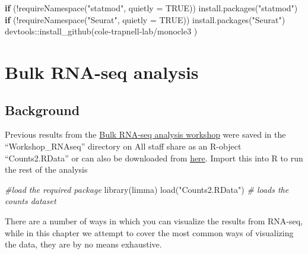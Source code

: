 \documentclass[
  openany]{book}
\newenvironment{Shaded}{\begin{snugshade}}{\end{snugshade}}
\newcommand{\AttributeTok}[1]{\textcolor[rgb]{0.77,0.63,0.00}{#1}}
\newcommand{\CommentTok}[1]{\textcolor[rgb]{0.56,0.35,0.01}{\textit{#1}}}
\newcommand{\ConstantTok}[1]{\textcolor[rgb]{0.00,0.00,0.00}{#1}}
\newcommand{\ControlFlowTok}[1]{\textcolor[rgb]{0.13,0.29,0.53}{\textbf{#1}}}
\newcommand{\FunctionTok}[1]{\textcolor[rgb]{0.00,0.00,0.00}{#1}}
\newcommand{\NormalTok}[1]{#1}
\newcommand{\SpecialCharTok}[1]{\textcolor[rgb]{0.00,0.00,0.00}{#1}}
\newcommand{\StringTok}[1]{\textcolor[rgb]{0.31,0.60,0.02}{#1}}
\begin{document}
\begin{Shaded}
\begin{Highlighting}[]
\ControlFlowTok{if}\NormalTok{ (}\SpecialCharTok{!}\FunctionTok{requireNamespace}\NormalTok{(}\StringTok{"statmod"}\NormalTok{, }\AttributeTok{quietly =} \ConstantTok{TRUE}\NormalTok{))}
  \FunctionTok{install.packages}\NormalTok{(}\StringTok{"statmod"}\NormalTok{)}
\ControlFlowTok{if}\NormalTok{ (}\SpecialCharTok{!}\FunctionTok{requireNamespace}\NormalTok{(}\StringTok{"Seurat"}\NormalTok{, }\AttributeTok{quietly =} \ConstantTok{TRUE}\NormalTok{))}
  \FunctionTok{install.packages}\NormalTok{(}\StringTok{"Seurat"}\NormalTok{)}
\NormalTok{devtools}\SpecialCharTok{::}\FunctionTok{install\_github}\NormalTok{(}\StringTok{\textquotesingle{}cole{-}trapnell{-}lab/monocle3\textquotesingle{}}
\NormalTok{)}
\end{Highlighting}
\end{Shaded}

\vspace{-100pt}

\hypertarget{bulk-rna-seq-analysis}{%
\chapter{Bulk RNA-seq analysis}\label{bulk-rna-seq-analysis}}

\hypertarget{background}{%
\section{Background}\label{background}}

Previous results from the \href{https://chisangad.github.io/bulkRNAseqtut/index.html}{Bulk RNA-seq analysis workshop} were saved in the ``Workshop\_RNAseq'' directory on All staff share as an R-object ``Counts2.RData'' or can also be downloaded from \href{https://latrobeuni-my.sharepoint.com/:u:/g/personal/dchisanga_ltu_edu_au/ES_FZpzdwPNJq-0bphUD3PoBbU63E7wUBEW6pERaRUkhYg?e=SR7eu7}{here}. Import this into R to run the rest of the analysis

\begin{Shaded}
\begin{Highlighting}[]
\CommentTok{\#load the required package}
\FunctionTok{library}\NormalTok{(limma)}
\FunctionTok{load}\NormalTok{(}\StringTok{"Counts2.RData"}\NormalTok{) }\CommentTok{\# loads the counts dataset}
\end{Highlighting}
\end{Shaded}

There are a number of ways in which you can visualize the results from RNA-seq, while in this chapter we attempt to cover the most common ways of visualizing the data, they are by no means exhaustive.
\end{document}
